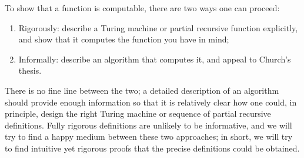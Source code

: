 \documentclass[../../../include/open-logic-section]{subfiles}
\begin{document}
To show that a function is computable, there are
two ways one can proceed:
\begin{enumerate}
\item Rigorously: describe a Turing machine or partial recursive
  function explicitly, and show that it computes the function you have
  in mind;
\item Informally: describe an algorithm that computes it, and appeal to
  Church's thesis.
\end{enumerate}
There is no fine line between the two; a detailed description of
an algorithm should provide enough information so that it is
relatively clear how one could, in principle, design the right Turing
machine or sequence of partial recursive definitions. Fully rigorous
definitions are unlikely to be informative, and we will try to find a
happy medium between these two approaches; in short, we will try to
find intuitive yet rigorous proofs that the precise definitions could
be obtained.
\end{document}
